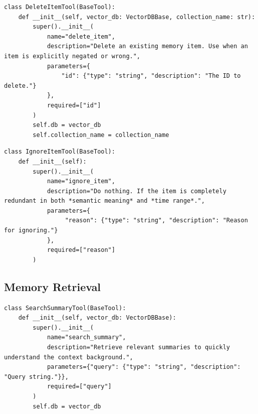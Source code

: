\documentclass[11pt, a4paper]{lumia}
\begin{document}
\begin{tcolorbox}[title={DeleteItemTool}, sharp corners, breakable, 
      colframe=Periwinkle, colback=white, 
        boxrule=3pt, boxsep=0.5pt, enhanced, 
        shadow={3pt}{-3pt}{0pt}{opacity=1}]
        \footnotesize
        {\selectfont
\begin{lstlisting}[breaklines=true,showstringspaces=false]
class DeleteItemTool(BaseTool):
    def __init__(self, vector_db: VectorDBBase, collection_name: str):
        super().__init__(
            name="delete_item",
            description="Delete an existing memory item. Use when an item is explicitly negated or wrong.",
            parameters={
                "id": {"type": "string", "description": "The ID to delete."}
            },
            required=["id"]
        )
        self.db = vector_db
        self.collection_name = collection_name
\end{lstlisting}
}
\end{tcolorbox}

\begin{tcolorbox}[title={IgnoreItemTool}, sharp corners, breakable, 
      colframe=Periwinkle, colback=white, 
        boxrule=3pt, boxsep=0.5pt, enhanced, 
        shadow={3pt}{-3pt}{0pt}{opacity=1}]
        \footnotesize
        {\selectfont
\begin{lstlisting}[breaklines=true,showstringspaces=false]
class IgnoreItemTool(BaseTool):
    def __init__(self):
        super().__init__(
            name="ignore_item",
            description="Do nothing. If the item is completely redundant in both *semantic meaning* and *time range*.",
            parameters={
                 "reason": {"type": "string", "description": "Reason for ignoring."}
            },
            required=["reason"]
        )
\end{lstlisting}
}
\end{tcolorbox}

\subsection{Memory Retrieval}
\begin{tcolorbox}[title={SearchSummaryTool}, sharp corners, breakable, 
      colframe=Periwinkle, colback=white, 
        boxrule=3pt, boxsep=0.5pt, enhanced, 
        shadow={3pt}{-3pt}{0pt}{opacity=1}]
        \footnotesize
        {\selectfont
\begin{lstlisting}[breaklines=true,showstringspaces=false]
class SearchSummaryTool(BaseTool):
    def __init__(self, vector_db: VectorDBBase):
        super().__init__(
            name="search_summary",
            description="Retrieve relevant summaries to quickly understand the context background.",
            parameters={"query": {"type": "string", "description": "Query string."}},
            required=["query"]
        )
        self.db = vector_db
\end{lstlisting}
}
\end{tcolorbox}
\end{document}
